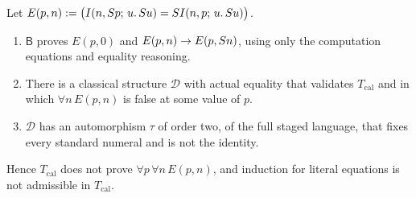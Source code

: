 \begin{theorem}
\label{obs:thm:numbering-barrier}
Let $E(p,n)\mathrel{:=}\bigl(I(n,S p;\,u.\,S u)=SI(n,p;\,u.\,S u)\bigr)$.
\begin{enumerate}[label=(\roman*)]
\item $\mathsf{B}$ proves $E(p,0)$ and $E(p,n)\to E(p,S n)$, using only
the computation equations and equality reasoning.
\item There is a classical structure $\mathcal{D}$ with actual equality that
validates $T_{\mathrm{cal}}$ and in which $\forall n\,E(p,n)$ is false at
some value of $p$.
\item $\mathcal{D}$ has an automorphism $\tau$ of order two, of the full
staged language, that fixes every standard numeral and is not the identity.
\end{enumerate}
Hence $T_{\mathrm{cal}}$ does not prove $\forall p\,\forall n\,E(p,n)$, and
induction for literal equations is not admissible in $T_{\mathrm{cal}}$.
\end{theorem}

